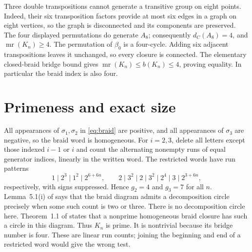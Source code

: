 \documentclass[11pt]{article}
\newcommand{\mr}{\operatorname{mr}}
\begin{document}
Three double transpositions cannot generate a transitive group on eight
points. Indeed, their six transposition factors provide at most six
edges in a graph on eight vertices, so the graph is disconnected and
its components are preserved. The four displayed permutations do
generate $A_8$; consequently $d_C(A_8)=4$, and $\mr(K_n)\ge4$.
The permutation of $\beta_0$ is a four-cycle. Adding six adjacent
transpositions leaves it unchanged, so every closure is connected.
The elementary closed-braid bridge bound gives
$\mr(K_n)\le b(K_n)\le4$, proving equality. In particular the braid
index is also four.

\section{Primeness and exact size}

All appearances of $\sigma_1,\sigma_2$ in \eqref{eq:braid} are positive,
and all appearances of $\sigma_3$ are negative, so the braid word is
homogeneous. For $i=2,3$, delete all letters except those indexed $i-1$
or $i$ and count the alternating nonempty runs of equal generator
indices, linearly in the written word. The restricted words have run
patterns
\[
 1\mid2^3\mid1^2\mid2^{6+6n},\qquad
 2\mid3^2\mid2\mid3^2\mid2^4\mid3\mid2^{3+6n},
\]
respectively, with signs suppressed. Hence $g_2=4$ and $g_3=7$ for
all $n$. Lemma~5.1(i) of \cite[printed p.~20]{flo} says that the braid
diagram admits a decomposition circle precisely when some such count
is two or three. There is no decomposition circle here. Theorem~1.1 of
\cite[printed p.~1]{flo} states that a nonprime homogeneous braid closure
has such a circle in this diagram. Thus $K_n$ is prime. It is nontrivial
because its bridge number is four. These are linear run counts; joining
the beginning and end of a restricted word would give the wrong test.
\end{document}
